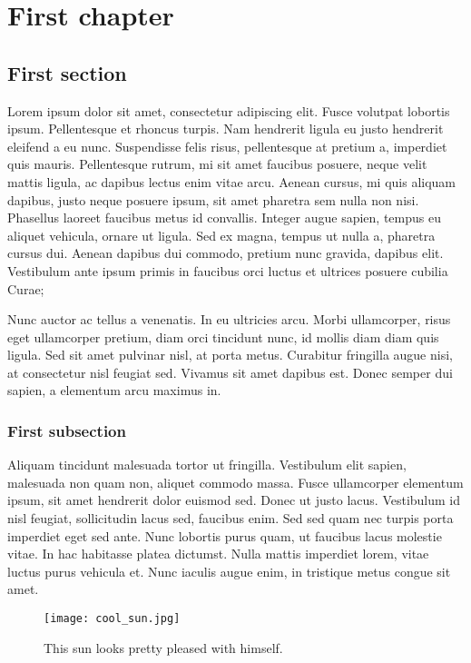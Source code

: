 \chapter{First chapter}

\section{First section}
Lorem ipsum dolor sit amet, consectetur adipiscing elit. Fusce volutpat lobortis ipsum. Pellentesque et rhoncus turpis. Nam hendrerit ligula eu justo hendrerit eleifend a eu nunc. Suspendisse felis risus, pellentesque at pretium a, imperdiet quis mauris. Pellentesque rutrum, mi sit amet faucibus posuere, neque velit mattis ligula, ac dapibus lectus enim vitae arcu. Aenean cursus, mi quis aliquam dapibus, justo neque posuere ipsum, sit amet pharetra sem nulla non nisi. Phasellus laoreet faucibus metus id convallis. Integer augue sapien, tempus eu aliquet vehicula, ornare ut ligula. Sed ex magna, tempus ut nulla a, pharetra cursus dui. Aenean dapibus dui commodo, pretium nunc gravida, dapibus elit. Vestibulum ante ipsum primis in faucibus orci luctus et ultrices posuere cubilia Curae;

\cite{daniel}
Nunc auctor ac tellus a venenatis. In eu ultricies arcu. Morbi ullamcorper, risus eget ullamcorper pretium, diam orci tincidunt nunc, id mollis diam diam quis ligula. Sed sit amet pulvinar nisl, at porta metus. Curabitur fringilla augue nisi, at consectetur nisl feugiat sed. Vivamus sit amet dapibus est. Donec semper dui sapien, a elementum arcu maximus in.

\subsection{First subsection}
Aliquam tincidunt malesuada tortor ut fringilla. Vestibulum elit sapien, malesuada non quam non, aliquet commodo massa. Fusce ullamcorper elementum ipsum, sit amet hendrerit dolor euismod sed. Donec ut justo lacus. Vestibulum id nisl feugiat, sollicitudin lacus sed, faucibus enim. Sed sed quam nec turpis porta imperdiet eget sed ante. Nunc lobortis purus quam, ut faucibus lacus molestie vitae. In hac habitasse platea dictumst. Nulla mattis imperdiet lorem, vitae luctus purus vehicula et. Nunc iaculis augue enim, in tristique metus congue sit amet.

\begin{figure}
\centering
\texttt{[image: cool\_sun.jpg]}
\caption[Short caption which will go in table of figures]{This sun looks pretty pleased with himself.}
\end{figure}

